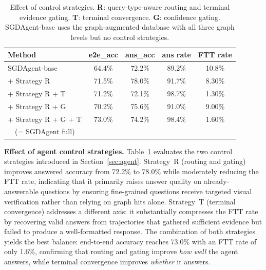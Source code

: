 \documentclass[sigconf, screen, review, anonymous]{acmart}
\begin{document}


\begin{table}[t]
  \centering
  \caption{Effect of control strategies.  \textbf{R}: query-type-aware
           routing and terminal evidence gating.  \textbf{T}: terminal
           convergence.  \textbf{G}: confidence gating. SGDAgent-base uses the graph-augmented database with all three
           graph levels but no control strategies.}
  \label{tab:strategy}
  \begin{tabular}{lcccc}
    \toprule
    Method & e2e\_acc & ans\_acc & ans rate & FTT rate \\
    \midrule
    SGDAgent-base          & 64.4\% & 72.2\% & 89.2\% & 10.8\% \\
    + Strategy R           & 71.5\% & 78.0\% & 91.7\% & 8.30\%  \\
    + Strategy R + T           & 71.2\% & 72.1\% & 98.7\% & 1.30\% \\
    + Strategy R + G           & 70.2\% & 75.6\% & 91.0\% & 9.00\% \\
    + Strategy R + G + T       & 73.0\% & 74.2\% & 98.4\% & 1.60\%  \\
    ~~(= SGDAgent full)    &        &        &        &        \\
    \bottomrule
  \end{tabular}
\end{table}

\textbf{Effect of agent control strategies.}\quad
Table~\ref{tab:strategy} evaluates the two control strategies
introduced in Section~\ref{sec:agent}.  Strategy~R (routing and gating)
improves answered accuracy from 72.2\% to 78.0\% while moderately
reducing the FTT rate, indicating that it primarily raises answer
quality on already-answerable questions by ensuring fine-grained
questions receive targeted visual verification rather than relying on
graph hits alone.  Strategy~T (terminal convergence) addresses a
different axis: it substantially compresses the FTT rate by
recovering valid answers from trajectories that gathered sufficient
evidence but failed to produce a well-formatted response.  The
combination of both strategies yields the best balance: end-to-end
accuracy reaches 73.0\% with an FTT rate of only 1.6\%, confirming
that routing and gating improve \emph{how well} the agent answers, while
terminal convergence improves \emph{whether} it answers.
\end{document}
